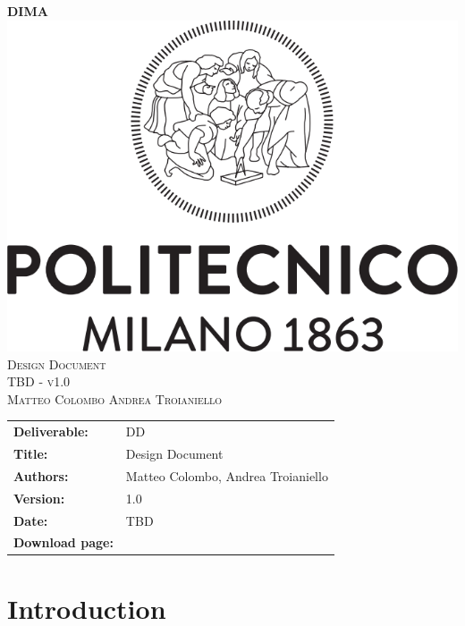 
\usepackage{float}
\usepackage[section]{placeins}


\begin{titlepage}
	\begin{center}
		\Huge{\bfseries{DIMA}}\\
		[3cm]
		\includegraphics[scale=0.3]{images/polimi}\\
		[3cm]
		\textsc{\Huge Design Document}\\[1cm]
		\textsc{\huge TBD - v1.0}\\
		[4cm]
		\textsc{\normalsize Matteo Colombo \hspace{0.4cm} Andrea Troianiello }
	\end{center}
\end{titlepage}
	
\begin{table}[h!]
\begin{tabu} to \textwidth { X[0.3,r,p] X[0.7,l,p] }
\hline

\textbf{Deliverable:} & DD\\
\textbf{Title:} & Design Document \\
\textbf{Authors:} & Matteo Colombo, Andrea Troianiello \\
\textbf{Version:} & 1.0 \\ 
\textbf{Date:} & TBD \\
\textbf{Download page:} & \href{https://github.com/MatteoColombo/dima-2018-colombo-troianiello}{\color{Black}{GitHub - DIMA-2018-Colombo-Troianiello repository}} \\
\hline
\end{tabu}
\end{table}

\clearpage
\tableofcontents
\listoffigures
\listoftables



\clearpage
{\section{Introduction}}
\label{sect:introduction}


